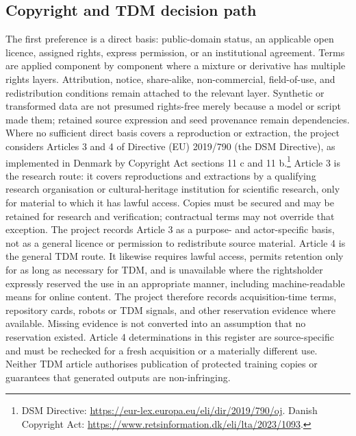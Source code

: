 \documentclass[9pt,a4paper]{article}
\begin{document}
\subsection{Copyright and TDM decision path}
The first preference is a direct basis: public-domain status, an applicable open licence, assigned rights, express permission, or an institutional agreement. Terms are applied component by component where a mixture or derivative has multiple rights layers. Attribution, notice, share-alike, non-commercial, field-of-use, and redistribution conditions remain attached to the relevant layer. Synthetic or transformed data are not presumed rights-free merely because a model or script made them; retained source expression and seed provenance remain dependencies.
Where no sufficient direct basis covers a reproduction or extraction, the project considers Articles 3 and 4 of Directive (EU) 2019/790 (the DSM Directive), as implemented in Denmark by Copyright Act sections 11 c and 11 b.\footnote{DSM Directive: \url{https://eur-lex.europa.eu/eli/dir/2019/790/oj}. Danish Copyright Act: \url{https://www.retsinformation.dk/eli/lta/2023/1093}.} Article 3 is the research route: it covers reproductions and extractions by a qualifying research organisation or cultural-heritage institution for scientific research, only for material to which it has lawful access. Copies must be secured and may be retained for research and verification; contractual terms may not override that exception. The project records Article 3 as a purpose- and actor-specific basis, not as a general licence or permission to redistribute source material.
Article 4 is the general TDM route. It likewise requires lawful access, permits retention only for as long as necessary for TDM, and is unavailable where the rightsholder expressly reserved the use in an appropriate manner, including machine-readable means for online content. The project therefore records acquisition-time terms, repository cards, robots or TDM signals, and other reservation evidence where available. Missing evidence is not converted into an assumption that no reservation existed. Article 4 determinations in this register are source-specific and must be rechecked for a fresh acquisition or a materially different use. Neither TDM article authorises publication of protected training copies or guarantees that generated outputs are non-infringing.
\end{document}
